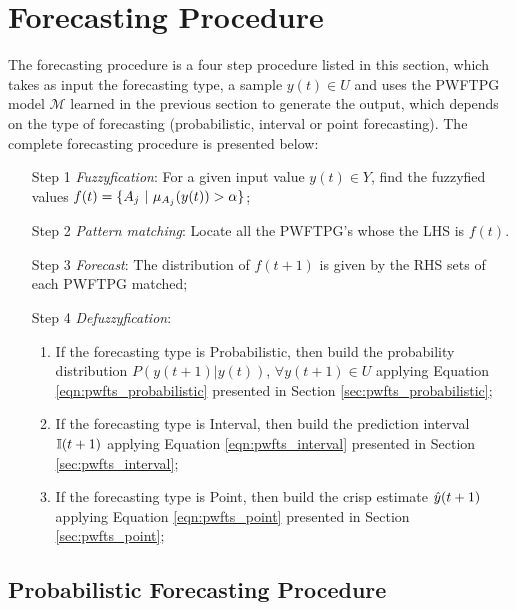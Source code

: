 \section{Forecasting Procedure}
\label{sec:pwfts_forecasting}

The forecasting procedure is a four step procedure listed in this section, which takes as input the forecasting type, a sample $y(t) \in U$ and uses the PWFTPG model $\mathcal{M}$ learned in the previous section to generate the output, which depends on the type of forecasting  (probabilistic, interval or point forecasting).  The complete forecasting procedure is presented below:

\begin{enumerate}
\item[Step 1] \textit{Fuzzyfication}: For a given input value $y(t) \in Y$, find the fuzzyfied values $f(t) = \{\ufset \ |\ \mu_{\ufset}(y(t)) > \alpha\}$;
\item[Step 2] \textit{Pattern matching}:  Locate all the PWFTPG's whose the LHS is $f(t)$.
\item[Step 3] \textit{Forecast}: The distribution of $f(t+1)$ is given by the RHS sets of each PWFTPG matched;
\item[Step 4] \textit{Defuzzyfication}: 
\begin{enumerate}
    \item If the forecasting type is Probabilistic, then build the probability distribution $P(y(t+1) | y(t))$, $\forall y(t+1) \in U$ applying Equation \eqref{eqn:pwfts_probabilistic} presented in Section \ref{sec:pwfts_probabilistic};
    \item If the forecasting type is Interval, then build the prediction interval $\mathbb{I}(t+1)$ applying Equation \eqref{eqn:pwfts_interval} presented in Section \ref{sec:pwfts_interval};
    \item If the forecasting type is Point, then build the crisp estimate $\hat{y}(t+1)$ applying Equation \eqref{eqn:pwfts_point} presented in Section \ref{sec:pwfts_point};
\end{enumerate}

\end{enumerate}


\subsection{Probabilistic Forecasting Procedure}
\label{sec:pwfts_probabilistic}

